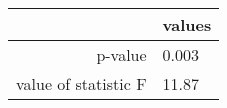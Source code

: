 \begin{tabular}{|r|l|}
  \hline
    & values \\
  \hline
  p-value & 0.003 \\
  \hline
  value of statistic F & 11.87 \\
  \hline
\end{tabular}
